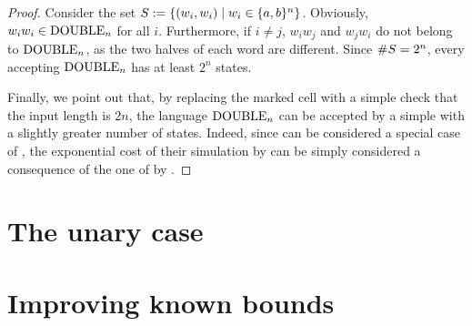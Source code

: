 \begin{proof}
	Consider the set $S:=\{(w_i,w_i)\mid w_i\in\{a,b\}^n\}$.
	Obviously, $w_iw_i\in\mathrm{DOUBLE}_n$ for all $i$.
	Furthermore, if $i\ne j$, $w_iw_j$ and $w_jw_i$ do not belong to $\mathrm{DOUBLE}_n$, as the two halves of each word are different.
	Since $\# S=2^n$, every \ONFA accepting $\mathrm{DOUBLE}_n$ has at least $2^n$ states.

	Finally, we point out that, by replacing the marked cell with a simple check that the input length is $2n$, the language $\mathrm{DOUBLE}_n$ can be accepted by a simple \TDFA with a slightly greater number of states.
	Indeed, since \TDFA can be considered a special case of \OMODLA, the exponential cost of their simulation by \ONFA can be simply considered a consequence of the one of \TDFA by \ONFA.
\end{proof}



\section{The unary case}\label{sec:oncemarking-unary}



\section{Improving known bounds}\label{sec:oncemarking-ideas}
